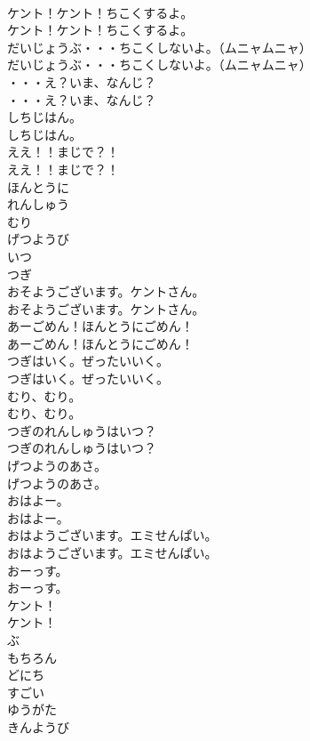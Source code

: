 \documentclass[8pt]{extreport}
\begin{document}
\begin{CJK}{UTF8}{min}
\\	ケント！ケント！ちこくするよ。	
\\	ケント！ケント！ちこくするよ。 
\\	だいじょうぶ・・・ちこくしないよ。（ムニャムニャ）	
\\	だいじょうぶ・・・ちこくしないよ。（ムニャムニャ） 
\\	・・・え？いま、なんじ？	
\\	・・・え？いま、なんじ？ 
\\	しちじはん。	
\\	しちじはん。 
\\	ええ！！まじで？！	
\\	ええ！！まじで？！ 
\\	ほんとうに
\\	れんしゅう
\\	むり
\\	げつようび
\\	いつ
\\	つぎ
\\	おそようございます。ケントさん。	
\\	おそようございます。ケントさん。 
\\	あーごめん！ほんとうにごめん！	
\\	あーごめん！ほんとうにごめん！ 
\\	つぎはいく。ぜったいいく。	
\\	つぎはいく。ぜったいいく。 
\\	むり、むり。	
\\	むり、むり。 
\\	つぎのれんしゅうはいつ？	
\\	つぎのれんしゅうはいつ？ 
\\	げつようのあさ。	
\\	げつようのあさ。 
\\	おはよー。	
\\	おはよー。 
\\	おはようございます。エミせんぱい。	
\\	おはようございます。エミせんぱい。 
\\	おーっす。	
\\	おーっす。 
\\	ケント！	
\\	ケント！ 
\\	ぶ
\\	もちろん
\\	どにち
\\	すごい
\\	ゆうがた
\\	きんようび

\end{CJK}
\end{document}
